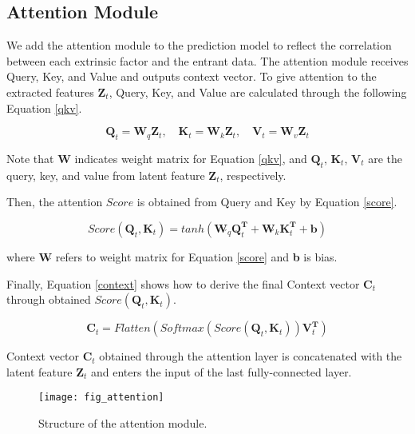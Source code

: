 \documentclass[conference]{IEEEtran}
\begin{document}
\subsection{Attention Module}

We add the attention module to the prediction model to reflect the correlation between each extrinsic factor and the entrant data. The attention module receives Query, Key, and Value and outputs context vector. To give attention to the extracted features \(\mathbf{Z}_t\), Query, Key, and Value are calculated through the following Equation \eqref{qkv}.

\begin{equation}
\mathbf{Q}_t = \mathbf{W}_{q}\mathbf{Z}_t, \quad \mathbf{K}_t = \mathbf{W}_{k}\mathbf{Z}_t, \quad \mathbf{V}_t = \mathbf{W}_v\mathbf{Z}_t \label{qkv}
\end{equation}

\noindent Note that \(\mathbf{W}\) indicates weight matrix for Equation \eqref{qkv}, and \(\mathbf{Q}_t\), \(\mathbf{K}_t\), \(\mathbf{V}_t\) are the query, key, and value from latent feature \(\mathbf{Z}_t\), respectively.

Then, the attention \(Score\) is obtained from Query and Key by Equation \eqref{score}.

\begin{equation}
Score(\mathbf{Q}_t, \mathbf{K}_t) = tanh(\mathbf{W}\acute{}_{q}\mathbf{Q}_t^\mathbf{T} + \mathbf{W}\acute{}_{k}\mathbf{K}_t^\mathbf{T} + \mathbf{b}) \label{score}
\end{equation}

\noindent where \(\mathbf{W}\acute{}\) refers to weight matrix for Equation \eqref{score} and \textbf{b} is bias.

Finally, Equation \eqref{context} shows how to derive the final Context vector \(\mathbf{C}_t\) through obtained \(Score(\mathbf{Q}_t, \mathbf{K}_t)\).

\begin{equation}
\mathbf{C}_t = Flatten(Softmax(Score(\mathbf{Q}_t, \mathbf{K}_t))\mathbf{V}_t^\mathbf{T}) \label{context}
\end{equation}

Context vector \(\mathbf{C}_t\) obtained through the attention layer is concatenated with the latent feature \(\mathbf{Z}_t\) and enters the input of the last fully-connected layer.

\begin{figure}[t]
\begin{center}
\texttt{[image: fig\_attention]}
\end{center}
   \caption{Structure of the attention module.}
\label{fig:fig6}
\end{figure}
\end{document}
